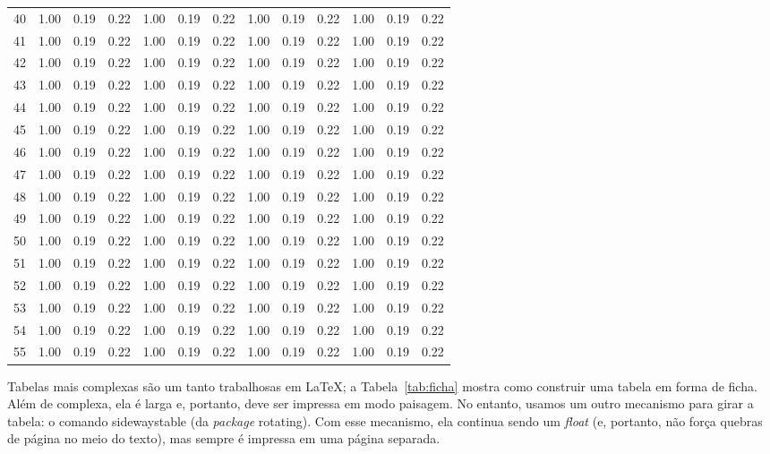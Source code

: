 \begin{center}
\begin{longtable}{|c|c|c|c|c|c|c|c|c|c|c|c|c|}
40 & 1.00 & 0.19 & 0.22 & 1.00 & 0.19 & 0.22 & 1.00 & 0.19 & 0.22 & 1.00 & 0.19 & 0.22 \\
41 & 1.00 & 0.19 & 0.22 & 1.00 & 0.19 & 0.22 & 1.00 & 0.19 & 0.22 & 1.00 & 0.19 & 0.22 \\
42 & 1.00 & 0.19 & 0.22 & 1.00 & 0.19 & 0.22 & 1.00 & 0.19 & 0.22 & 1.00 & 0.19 & 0.22 \\
43 & 1.00 & 0.19 & 0.22 & 1.00 & 0.19 & 0.22 & 1.00 & 0.19 & 0.22 & 1.00 & 0.19 & 0.22 \\
44 & 1.00 & 0.19 & 0.22 & 1.00 & 0.19 & 0.22 & 1.00 & 0.19 & 0.22 & 1.00 & 0.19 & 0.22 \\
45 & 1.00 & 0.19 & 0.22 & 1.00 & 0.19 & 0.22 & 1.00 & 0.19 & 0.22 & 1.00 & 0.19 & 0.22 \\
46 & 1.00 & 0.19 & 0.22 & 1.00 & 0.19 & 0.22 & 1.00 & 0.19 & 0.22 & 1.00 & 0.19 & 0.22 \\
47 & 1.00 & 0.19 & 0.22 & 1.00 & 0.19 & 0.22 & 1.00 & 0.19 & 0.22 & 1.00 & 0.19 & 0.22 \\
48 & 1.00 & 0.19 & 0.22 & 1.00 & 0.19 & 0.22 & 1.00 & 0.19 & 0.22 & 1.00 & 0.19 & 0.22 \\
49 & 1.00 & 0.19 & 0.22 & 1.00 & 0.19 & 0.22 & 1.00 & 0.19 & 0.22 & 1.00 & 0.19 & 0.22 \\
50 & 1.00 & 0.19 & 0.22 & 1.00 & 0.19 & 0.22 & 1.00 & 0.19 & 0.22 & 1.00 & 0.19 & 0.22 \\
51 & 1.00 & 0.19 & 0.22 & 1.00 & 0.19 & 0.22 & 1.00 & 0.19 & 0.22 & 1.00 & 0.19 & 0.22 \\
52 & 1.00 & 0.19 & 0.22 & 1.00 & 0.19 & 0.22 & 1.00 & 0.19 & 0.22 & 1.00 & 0.19 & 0.22 \\
53 & 1.00 & 0.19 & 0.22 & 1.00 & 0.19 & 0.22 & 1.00 & 0.19 & 0.22 & 1.00 & 0.19 & 0.22 \\
54 & 1.00 & 0.19 & 0.22 & 1.00 & 0.19 & 0.22 & 1.00 & 0.19 & 0.22 & 1.00 & 0.19 & 0.22 \\
55 & 1.00 & 0.19 & 0.22 & 1.00 & 0.19 & 0.22 & 1.00 & 0.19 & 0.22 & 1.00 & 0.19 & 0.22 \\

\end{longtable}
\end{center}

Tabelas mais complexas são um tanto trabalhosas em \LaTeX{}; a
Tabela~\ref{tab:ficha} mostra como construir uma tabela em forma de ficha.
Além de complexa, ela é larga e, portanto, deve ser impressa em modo
paisagem. No entanto, usamos um outro mecanismo para girar a tabela: o
comando \textsf{sidewaystable} (da \textit{package} \textsf{rotating}).
Com esse mecanismo, ela continua sendo um \textit{float} (e, portanto,
não força quebras de página no meio do texto), mas sempre é impressa em
uma página separada.

